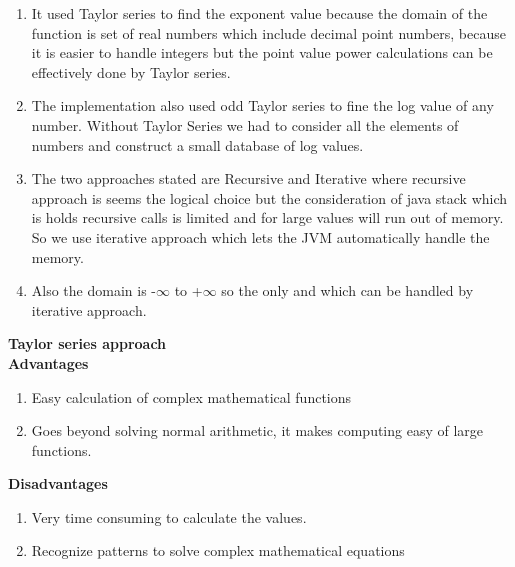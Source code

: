 \documentclass[a4paper, 11pt]{article}
\begin{document}
\begin{enumerate}
    \item It used Taylor series to find the exponent value because the domain of the function is set of real numbers which include decimal point numbers, because it is easier to handle integers but the point value power calculations can be effectively done by Taylor series.
    \item The implementation also used odd Taylor series to fine the log value of any number. Without Taylor Series we had to consider all the elements of numbers and construct a small database of log values.
    \item The two approaches stated are Recursive and Iterative where recursive approach is seems the logical choice but the consideration of java stack which is holds recursive calls is limited and for large values will run out of memory. So we use iterative approach which lets the JVM automatically handle the memory.
    \item Also the domain is -$\infty$ to +$\infty$ so the only and which can be handled by iterative approach.
\end{enumerate}
\textbf{Taylor series approach}\\
\textbf{Advantages}
\begin{enumerate}
    \item Easy calculation of complex mathematical functions
    \item Goes beyond solving normal arithmetic, it makes computing easy of large functions.
\end{enumerate}
\textbf{Disadvantages}
\begin{enumerate}
    \item Very time consuming to calculate the values.
    \item Recognize patterns to solve complex mathematical equations
\end{enumerate}
\end{document}
